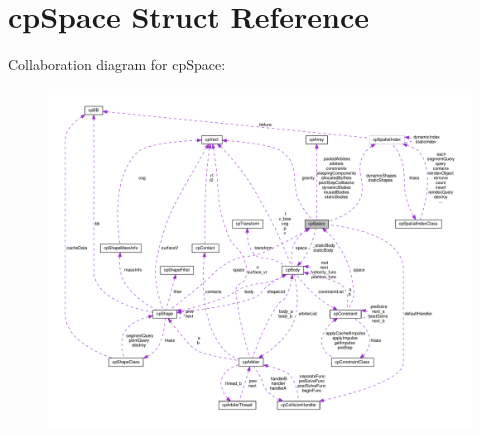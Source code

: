 \hypertarget{structcpSpace}{}\section{cp\+Space Struct Reference}
\label{structcpSpace}


Collaboration diagram for cp\+Space\+:
\nopagebreak
\begin{figure}[H]
\begin{center}
\leavevmode
\includegraphics[width=350pt]{structcpSpace__coll__graph}
\end{center}
\end{figure}
